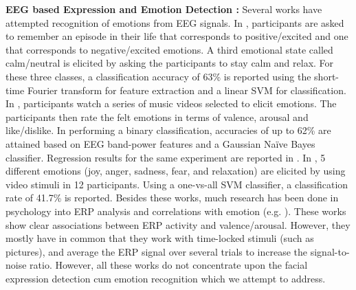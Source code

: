 \textbf{EEG based Expression and Emotion Detection : }Several works have attempted recognition of emotions from EEG signals. In \cite{channel2009}, participants are asked to remember an episode in their life that corresponds to positive/excited and one that corresponds to negative/excited emotions. A third emotional state called calm/neutral is elicited by asking the participants to stay calm and relax. For these three classes, a classification accuracy of 63\% is reported using the short-time Fourier transform for feature extraction and a linear SVM for classification. In \cite{deap}, participants watch a series of music videos selected to elicit emotions. The participants then rate the felt emotions in terms of valence, arousal and like/dislike. In performing a binary classification, accuracies of up to 62\% are attained based on EEG band-power features and a Gaussian Naïve Bayes classifier. Regression results for the same experiment are reported in \cite{soleymani}. In \cite{takahashi}, 5 different emotions (joy, anger, sadness, fear, and relaxation) are elicited by using video stimuli in 12 participants. Using a one-vs-all SVM classifier, a classification rate of 41.7\% is reported. Besides these works, much research has been done in psychology into ERP analysis and correlations with emotion (e.g. \cite{olof,cuthbert}). These works show clear associations between ERP activity and valence/arousal. However, they mostly have in common that they work with time-locked stimuli (such as pictures), and average the ERP signal over several trials to increase the signal-to-noise ratio. However, all these works do not concentrate upon the facial expression detection cum emotion recognition which we attempt to address.